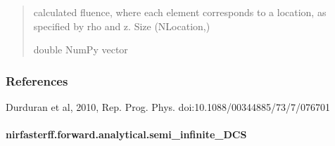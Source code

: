 \documentclass[letterpaper,10pt,english]{sphinxmanual}
\begin{document}
\begin{fulllineitems}
\begin{quote}
\begin{description}
\begin{itemize}
\end{itemize}

\sphinxAtStartPar
calculated fluence, where each element corresponds to a location, as specified by rho and z. Size (NLocation,)

\sphinxAtStartPar
double NumPy vector

\end{description}\end{quote}
\subsubsection*{References}

\sphinxAtStartPar
Durduran et al, 2010, Rep. Prog. Phys. doi:10.1088/0034\sphinxhyphen{}4885/73/7/076701

\end{fulllineitems}


\sphinxstepscope


\paragraph{nirfasterff.forward.analytical.semi\_infinite\_DCS}
\label{\detokenize{_autosummary/nirfasterff.forward.analytical.semi_infinite_DCS:nirfasterff-forward-analytical-semi-infinite-dcs}}\label{\detokenize{_autosummary/nirfasterff.forward.analytical.semi_infinite_DCS::doc}}
\end{document}
